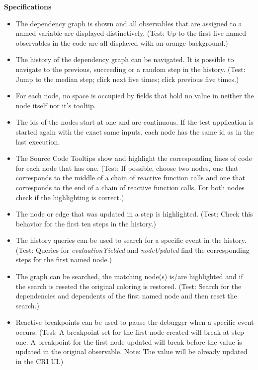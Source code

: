 \textbf{Specifications}
\begin{itemize}
	\item The dependency graph is shown and all observables that are assigned to a named variable are displayed distinctively. (Test: Up to the first five named observables in the code are all displayed with an orange background.)
	\item The history of the dependency graph can be navigated. It is possible to navigate to the previous, succeeding or a random step in the history. (Test: Jump to the median step; click next five times; click previous five times.)
	\item For each node, no space is occupied by fields that hold no value in neither the node itself nor it's tooltip.
	\item The ids of the nodes start at one and are continuous. If the test application is started again with the exact same inputs, each node has the same id as in the last execution.
	\item The Source Code Tooltips show and highlight the corresponding lines of code for each node that has one. (Test: If possible, choose two nodes, one that corresponds to the middle of a chain of reactive function calls and one that corresponds to the end of a chain of reactive function calls. For both nodes check if the highlighting is correct.)
	\item The node or edge that was updated in a step is highlighted. (Test: Check this behavior for the first ten steps in the history.)
	\item The history queries can be used to search for a specific event in the history. (Test: Queries for \emph{evaluationYielded} and \emph{nodeUpdated} find the corresponding steps for the first named node.)
	\item The graph can be searched, the matching node(s) is/are highlighted and if the search is reseted the original coloring is restored. (Test: Search for the dependencies and dependents of the first named node and then reset the search.)
	\item Reactive breakpoints can be used to pause the debugger when a specific event occurs. (Test: A breakpoint set for the first node created will break at step one. A breakpoint for the first node updated will break before the value is updated in the original observable. Note: The value will be already updated in the CRI UI.)
\end{itemize}


